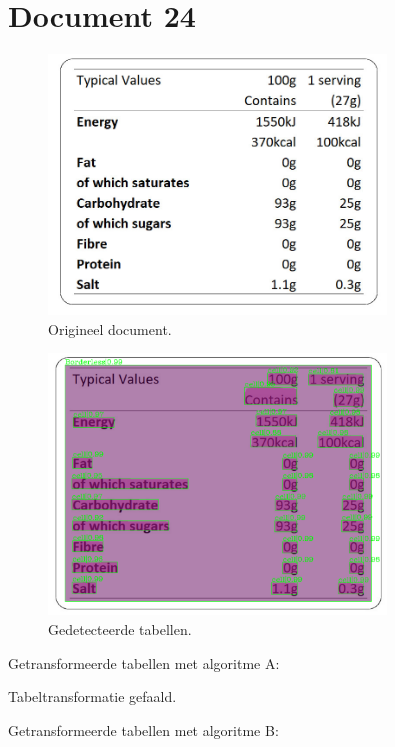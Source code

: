 \section{Document 24}

\begin{figure}[H]
    \centering
    \includegraphics[width=0.8\textwidth]{test-resultaten/24/original.jpg}
    \caption{Origineel document.}
\end{figure}

\begin{figure}[H]
    \centering
    \includegraphics[width=0.8\textwidth]{test-resultaten/24/detected_tables.png}
    \caption{Gedetecteerde tabellen.}
\end{figure}

Getransformeerde tabellen met algoritme A:

Tabeltransformatie gefaald.

Getransformeerde tabellen met algoritme B:

